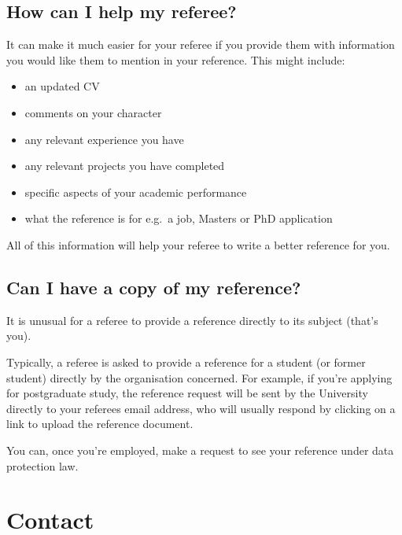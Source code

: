 \documentclass[
  12pt,
]{book}
\providecommand{\tightlist}{%
  \setlength{\itemsep}{0pt}\setlength{\parskip}{0pt}}
\begin{document}
\hypertarget{how-can-i-help-my-referee}{%
\section{How can I help my referee?}\label{how-can-i-help-my-referee}}

It can make it much easier for your referee if you provide them with information you would like them to mention in your reference. This might include:

\begin{itemize}
\tightlist
\item
  an updated CV\\
\item
  comments on your character
\item
  any relevant experience you have
\item
  any relevant projects you have completed
\item
  specific aspects of your academic performance
\item
  what the reference is for e.g.~a job, Masters or PhD application
\end{itemize}

All of this information will help your referee to write a better reference for you.

\hypertarget{can-i-have-a-copy-of-my-reference}{%
\section{Can I have a copy of my reference?}\label{can-i-have-a-copy-of-my-reference}}

It is unusual for a referee to provide a reference directly to its subject (that's you).

Typically, a referee is asked to provide a reference for a student (or former student) directly by the organisation concerned. For example, if you're applying for postgraduate study, the reference request will be sent by the University directly to your referees email address, who will usually respond by clicking on a link to upload the reference document.

You can, once you're employed, make a request to see your reference under data protection law.

\hypertarget{contact}{%
\chapter{Contact}\label{contact}}
\end{document}
